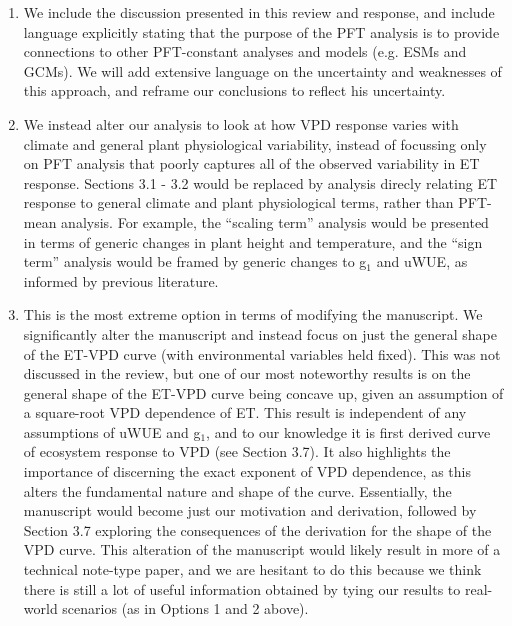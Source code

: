 \begin{enumerate}
\item We include the discussion presented in this review and response,
  and include language explicitly stating that the purpose of the PFT
  analysis is to provide connections to other PFT-constant analyses
  and models (e.g. ESMs and GCMs). We will add extensive language on
  the uncertainty and weaknesses of this approach, and reframe our
  conclusions to reflect his uncertainty.
\item We instead alter our analysis to look at how VPD response varies
  with climate and general plant physiological variability, instead of
  focussing only on PFT analysis that poorly captures all of the observed
  variability in ET response. Sections 3.1 - 3.2 would be replaced by
  analysis direcly relating ET response to general climate and plant
  physiological terms, rather than PFT-mean analysis. For example, the
  ``scaling term'' analysis would be presented in terms of generic
  changes in plant height and temperature, and the ``sign term''
  analysis would be framed by generic changes to g$_1$ and uWUE, as
  informed by previous literature.
\item This is the most extreme option in terms of modifying the
  manuscript. We significantly alter the manuscript and instead focus
  on just the general shape of the ET-VPD curve (with environmental
  variables held fixed). This was not discussed in the review, but one
  of our most noteworthy results is on the general shape of the ET-VPD
  curve being concave up, given an assumption of a square-root VPD
  dependence of ET. This result is independent of any assumptions of
  uWUE and g$_1$, and to our knowledge it is first derived curve of
  ecosystem response to VPD (see Section 3.7). It also highlights the
  importance of discerning the exact exponent of VPD dependence, as
  this alters the fundamental nature and shape of the
  curve. Essentially, the manuscript would become just our motivation
  and derivation, followed by Section 3.7 exploring the consequences
  of the derivation for the shape of the VPD curve. This alteration of
  the manuscript would likely result in more of a technical note-type
  paper, and we are hesitant to do this because we think there is
  still a lot of useful information obtained by tying our results to
  real-world scenarios (as in Options 1 and 2 above).
\end{enumerate}

